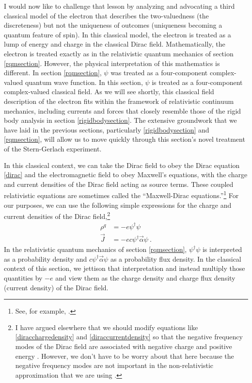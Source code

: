 \documentclass[onecolumn,secnumarabic,amsmath,amssymb,balancelastpage,nofootinbib]{article}
\begin{document}
I would now like to challenge that lesson by analyzing and advocating a third classical model of the electron that describes the two-valuedness (the discreteness) but not the uniqueness of outcomes (uniqueness becoming a quantum feature of spin).  In this classical model, the electron is treated as a lump of energy and charge in the classical Dirac field.  Mathematically, the electron is treated exactly as in the relativistic quantum mechanics of section \ref{rqmsection}.  However, the physical interpretation of this mathematics is different.  In section \ref{rqmsection}, $\psi$ was treated as a four-component complex-valued quantum wave function.  In this section, $\psi$ is treated as a four-component complex-valued classical field.  As we will see shortly, this classical field description of the electron fits within the framework of relativistic continuum mechanics, including currents and forces that closely resemble those of the rigid body analysis in section \ref{rigidbodysection}.  The extensive groundwork that we have laid in the previous sections, particularly \ref{rigidbodysection} and \ref{rqmsection}, will allow us to move quickly through this section's novel treatment of the Stern-Gerlach experiment.

In this classical context, we can take the Dirac field to obey the Dirac equation \eqref{dirac} and the electromagnetic field to obey Maxwell's equations, with the charge and current densities of the Dirac field acting as source terms.  These coupled relativistic equations are sometimes called the ``Maxwell-Dirac equations.''\footnote{See, for example, \citet{gross1966, glassey1979, flato1987}.}  For our purposes, we can use the following simple expressions for the charge and current densities of the Dirac field,\footnote{I have argued elsewhere that we should modify equations like \eqref{diracchargedensity} and \eqref{diraccurrentdensity} so that the negative frequency modes of the Dirac field are associated with negative charge and positive energy \citep{positrons}.  However, we don't have to be worry about that here because the negative frequency modes are not important in the non-relativistic approximation that we are using \citep[pg.\ 10]{bjorkendrell}.}
\begin{align}
\rho^q&=-e \psi^\dagger \psi
\label{diracchargedensity}
\\
\vec{J}&=-e c \psi^\dagger \vec{\alpha} \psi
\label{diraccurrentdensity}\ .
\end{align}
In the relativistic quantum mechanics of section \ref{rqmsection}, $\psi^\dagger \psi$ is interpreted as a probability density and $c \psi^\dagger \vec{\alpha} \psi$ as a probability flux density.  In the classical context of this section, we jettison that interpretation and instead multiply those quantities by $-e$ and view them as the charge density and charge flux density (current density) of the Dirac field.
\end{document}
